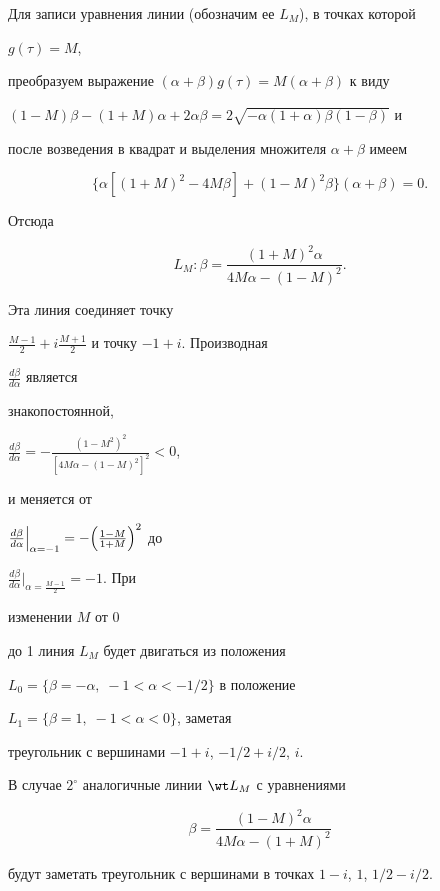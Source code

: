 Для записи уравнения линии (обозначим ее $L_M$), в точках которой


$g(\tau)=M$,


преобразуем выражение $(\alpha+\beta)g(\tau)=M(\alpha+\beta)$ к виду


$(1-M)\beta-(1+M)\alpha+2\alpha\beta=


2\sqrt{-\alpha(1+\alpha)\beta(1-\beta)}$ и


после возведения в квадрат и выделения множителя $\alpha+\beta$ имеем


$$


\{\alpha[(1+M)^2-4M\beta]+(1-M)^2\beta\}(\alpha+\beta)=0.


$$


Отсюда


\begin{equation}


L_M:\beta=\frac{(1+M)^2\alpha}{4M\alpha-(1-M)^2}.


\end{equation}


Эта линия соединяет точку


$\frac{M-1}{2}+i\frac{M+1}{2}$ и точку $-1+i$. Производная


$\frac{d\beta}{d\alpha}$ является


знакопостоянной,


$\frac{d\beta}{d\alpha}=-\frac{(1-M^2)^2}{[4M\alpha-(1-M)^2]^2}<0$,


и меняется от


$\frac{d\beta}{d\alpha}\Big|_{\alpha=-1}=


-\Bigl(\frac{1-M}{1+M}\Bigr)^2$ до


$\frac{d\beta}{d\alpha}\Big|_{\alpha=\frac{M-1}{2}}=-1$. При


изменении $M$ от 0


до 1 линия $L_M$ будет двигаться из положения


$L_0=\{\beta=-\alpha,\;-1<\alpha<-1/2\}$ в положение


$L_1=\{\beta=1,\;-1<\alpha<0\}$, заметая


треугольник с вершинами $-1+i$, $-1/2+i/2$, $i$.





В случае $2^\circ$ аналогичные линии $\wt L_M$ с уравнениями


$$


\beta=\frac{(1-M)^2\alpha}{4M\alpha-(1+M)^2}


$$


будут заметать треугольник с вершинами в точках $1-i$, $1$, $1/2-i/2$.





